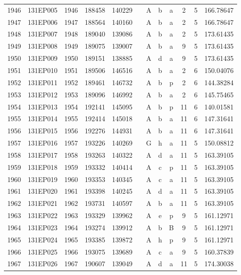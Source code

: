 \begin{tabular}{|*{12}{c|}}
1946 & 131EP005 & 1946 & 188458 & 140229 &  & A & b & a & 2 & 5 & 166.78647 \\ 
1947 & 131EP006 & 1947 & 188564 & 140160 &  & A & b & a & 2 & 5 & 166.78647 \\ 
1948 & 131EP007 & 1948 & 189040 & 139086 &  & A & b & a & 2 & 5 & 173.61435 \\ 
1949 & 131EP008 & 1949 & 189075 & 139007 &  & A & b & a & 9 & 5 & 173.61435 \\ 
1950 & 131EP009 & 1950 & 189151 & 138885 &  & A & d & a & 9 & 5 & 173.61435 \\ 
1951 & 131EP010 & 1951 & 189506 & 146516 &  & A & b & a & 2 & 6 & 150.04076 \\ 
1952 & 131EP011 & 1952 & 189461 & 146732 &  & A & b & p & 2 & 6 & 144.38284 \\ 
1953 & 131EP012 & 1953 & 189096 & 146992 &  & A & b & a & 2 & 6 & 145.75465 \\ 
1954 & 131EP013 & 1954 & 192141 & 145095 &  & A & b & p & 11 & 6 & 140.01581 \\ 
1955 & 131EP014 & 1955 & 192414 & 145018 &  & A & b & a & 11 & 6 & 147.31641 \\ 
1956 & 131EP015 & 1956 & 192276 & 144931 &  & A & b & a & 11 & 6 & 147.31641 \\ 
1957 & 131EP016 & 1957 & 193226 & 140269 &  & G & h & a & 11 & 5 & 150.08812 \\ 
1958 & 131EP017 & 1958 & 193263 & 140322 &  & A & d & a & 11 & 5 & 163.39105 \\ 
1959 & 131EP018 & 1959 & 193332 & 140414 &  & A & c & p & 11 & 5 & 163.39105 \\ 
1960 & 131EP019 & 1960 & 193353 & 140345 &  & A & c & a & 11 & 5 & 163.39105 \\ 
1961 & 131EP020 & 1961 & 193398 & 140245 &  & A & d & a & 11 & 5 & 163.39105 \\ 
1962 & 131EP021 & 1962 & 193731 & 140597 &  & A & b & a & 11 & 5 & 163.39105 \\ 
1963 & 131EP022 & 1963 & 193329 & 139962 &  & A & e & p & 9 & 5 & 161.12971 \\ 
1964 & 131EP023 & 1964 & 193274 & 139912 &  & A & b & B & 9 & 5 & 161.12971 \\ 
1965 & 131EP024 & 1965 & 193385 & 139872 &  & A & h & p & 9 & 5 & 161.12971 \\ 
1966 & 131EP025 & 1966 & 193075 & 139689 &  & A & c & a & 9 & 5 & 160.37839 \\ 
1967 & 131EP026 & 1967 & 190607 & 139049 &  & A & d & a & 11 & 5 & 174.30038 \\ 

\end{tabular}
